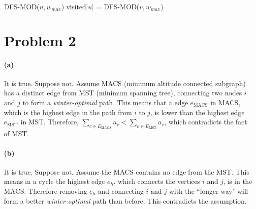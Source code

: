 \documentclass[a4paper,12pt]{article}
\begin{document}
\begin{algorithm}
\begin{algorithmic}
\STATE DFS-MOD($u, w_{max}$)
\STATE visited[$u$] = \TRUE
{}
\STATE DFS-MOD($v, w_{max}$)
\ENDIF
\ENDFOR
\end{algorithmic}
\end{algorithm}

\section*{Problem 2}
\paragraph*{(a)} It is true. Suppose not. Assume MACS (minimum 
altitude connected subgraph) has a distinct edge from MST (minimum 
spanning tree), connecting two nodes $i$ and $j$ to form a 
\textit{winter-optimal} path. This means that a edge $e_{\text{MACS}}$
in MACS, which is the highest edge in the path from $i$ to $j$, is 
lower than the highest edge $e_{\text{MST}}$ in MST. Therefore,
$\sum\limits_{e \in E_{\text{MACS}}}a_e < \sum\limits_{e \in 
 E_{\text{MST}}}a_e$, which contradicts the fact of MST.

%
%

\paragraph*{(b)}
It is true. Suppose not. Assume the MACS contains no edge from the 
MST. This means in a cycle the highest edge $e_h$, which connects
the vertices $i$ and $j$, is in the MACS. Therefore removing $e_h$ and 
connecting $i$ and $j$ with the ``longer way" will form a better 
\textit{winter-optimal} path than before. This contradicts the 
assumption.
\end{document}
